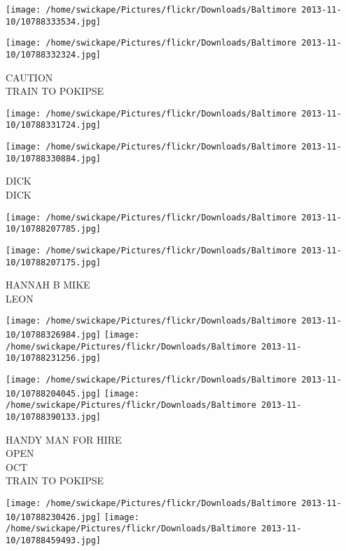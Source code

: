 \documentclass[10pt,letterpaper]{article}
\begin{document}
\texttt{[image: /home/swickape/Pictures/flickr/Downloads/Baltimore 2013-11-10/10788333534.jpg]}

\vspace{0.25in}
\texttt{[image: /home/swickape/Pictures/flickr/Downloads/Baltimore 2013-11-10/10788332324.jpg]}

CAUTION\\
TRAIN TO POKIPSE\\
\pagebreak

\texttt{[image: /home/swickape/Pictures/flickr/Downloads/Baltimore 2013-11-10/10788331724.jpg]}

\vspace{0.25in}
\texttt{[image: /home/swickape/Pictures/flickr/Downloads/Baltimore 2013-11-10/10788330884.jpg]}

DICK\\
DICK\\
\pagebreak

\texttt{[image: /home/swickape/Pictures/flickr/Downloads/Baltimore 2013-11-10/10788207785.jpg]}

\vspace{0.25in}
\texttt{[image: /home/swickape/Pictures/flickr/Downloads/Baltimore 2013-11-10/10788207175.jpg]}

HANNAH B MIKE\\
LEON\\
\pagebreak

\texttt{[image: /home/swickape/Pictures/flickr/Downloads/Baltimore 2013-11-10/10788326984.jpg]}
\texttt{[image: /home/swickape/Pictures/flickr/Downloads/Baltimore 2013-11-10/10788231256.jpg]}

\texttt{[image: /home/swickape/Pictures/flickr/Downloads/Baltimore 2013-11-10/10788204045.jpg]}
\texttt{[image: /home/swickape/Pictures/flickr/Downloads/Baltimore 2013-11-10/10788390133.jpg]}

HANDY MAN FOR HIRE\\
OPEN\\
OCT\\
TRAIN TO POKIPSE\\
\pagebreak

\texttt{[image: /home/swickape/Pictures/flickr/Downloads/Baltimore 2013-11-10/10788230426.jpg]}
\texttt{[image: /home/swickape/Pictures/flickr/Downloads/Baltimore 2013-11-10/10788459493.jpg]}
\end{document}
